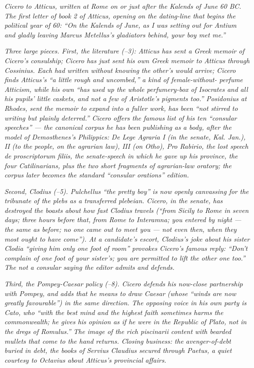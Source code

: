 
\textit{Cicero to Atticus, written at Rome on or just after
the Kalends of June 60 BC. The first letter of book 2 of
Atticus, opening on the dating-line that begins the political
year of 60: ``On the Kalends of June, as I was setting out
for Antium and gladly leaving Marcus Metellus's gladiators
behind, your boy met me.''}

\textit{Three large pieces. First, the literature
(--3): Atticus has sent a Greek memoir of
Cicero's consulship; Cicero has just sent his own Greek
memoir to Atticus through Cossinius. Each had written without
knowing the other's would arrive; Cicero finds Atticus's
``a little rough and uncombed,'' a kind of female-without-
perfume Atticism, while his own ``has used up the whole
perfumery-box of Isocrates and all his pupils' little
caskets, and not a few of Aristotle's pigments too.''
Posidonius at Rhodes, sent the memoir to expand into a fuller
work, has been ``not stirred to writing but plainly
deterred.'' Cicero offers the famous list of his ten
``consular speeches'' --- the canonical corpus he has been
publishing as a body, after the model of Demosthenes's
Philippics: \textit{De Lege Agraria} I (in the senate, Kal.
Jan.), II (to the people, on the agrarian law), III (on
Otho), \textit{Pro Rabirio}, the lost speech \textit{de
proscriptorum filiis}, the senate-speech in which he gave
up his province, the four \textit{Catilinarians}, plus the
two short fragments of agrarian-law oratory; the corpus
later becomes the standard ``consular orations'' edition.}

\textit{Second, Clodius (--5). Pulchellus
``the pretty boy'' is now openly canvassing for the tribunate
of the plebs as a transferred plebeian. Cicero, in the senate,
has destroyed the boasts about how fast Clodius travels (``from
Sicily to Rome in seven days; three hours before that, from
Rome to Interamna; you entered by night --- the same as
before; no one came out to meet you --- not even then, when
they most ought to have come''). At a candidate's escort,
Clodius's joke about his sister Clodia ``giving him only one
foot of room'' provokes Cicero's famous reply: ``Don't
complain of one foot of your sister's; you are permitted to
lift the other one too.'' The \textit{not a consular saying}
the editor admits and defends.}

\textit{Third, the Pompey-Caesar policy (--8).
Cicero defends his now-close partnership with Pompey, and adds
that he means to draw Caesar (whose ``winds are now greatly
favourable'') in the same direction. The opposing voice in his
own party is Cato, who ``with the best mind and the highest
faith sometimes harms the commonwealth; he gives his opinion
as if he were in the Republic of Plato, not in the dregs of
Romulus.'' The image of the rich \textit{piscinarii} content
with bearded mullets that come to the hand returns. Closing
business: the avenger-of-debt buried in debt, the books of
Servius Claudius secured through Paetus, a quiet courtesy to
Octavius about Atticus's provincial affairs.}
